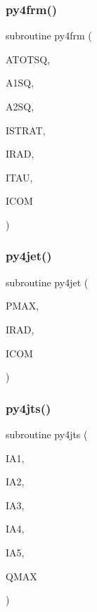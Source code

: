\subsubsection{\texorpdfstring{py4frm()}{py4frm()}}
{\footnotesize\ttfamily subroutine py4frm (\begin{DoxyParamCaption}\item[{}]{A\+T\+O\+T\+SQ,  }\item[{}]{A1\+SQ,  }\item[{}]{A2\+SQ,  }\item[{}]{I\+S\+T\+R\+AT,  }\item[{}]{I\+R\+AD,  }\item[{}]{I\+T\+AU,  }\item[{}]{I\+C\+OM }\end{DoxyParamCaption})}

\mbox{\label{pythia-6_84_824_8f_a050131d873ec9273038b54fda8ccc6c1}} 
\subsubsection{\texorpdfstring{py4jet()}{py4jet()}}
{\footnotesize\ttfamily subroutine py4jet (\begin{DoxyParamCaption}\item[{}]{P\+M\+AX,  }\item[{}]{I\+R\+AD,  }\item[{}]{I\+C\+OM }\end{DoxyParamCaption})}

\mbox{\label{pythia-6_84_824_8f_a6035a797526aac4beb1aec91a7e87d21}} 
\subsubsection{\texorpdfstring{py4jts()}{py4jts()}}
{\footnotesize\ttfamily subroutine py4jts (\begin{DoxyParamCaption}\item[{}]{I\+A1,  }\item[{}]{I\+A2,  }\item[{}]{I\+A3,  }\item[{}]{I\+A4,  }\item[{}]{I\+A5,  }\item[{}]{Q\+M\+AX }\end{DoxyParamCaption})}

